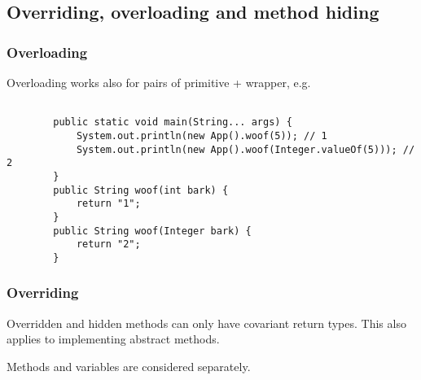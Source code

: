 \documentclass{scrartcl}
\begin{document}
\subsection{Overriding, overloading and method hiding}
\subsubsection{Overloading}

    Overloading works also for pairs of primitive + wrapper, e.g.

    \begin{lstlisting}

        public static void main(String... args) {
            System.out.println(new App().woof(5)); // 1
            System.out.println(new App().woof(Integer.valueOf(5))); // 2
        }
        public String woof(int bark) {
            return "1";
        }
        public String woof(Integer bark) {
            return "2";
        }
    \end{lstlisting}

\subsubsection{Overriding}

    Overridden and hidden methods can only have covariant return types.
    This also applies to implementing abstract methods.

    Methods and variables are considered separately.
\end{document}
